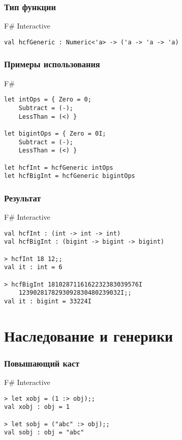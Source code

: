 \documentclass[xetex,mathserif,serif]{beamer}
\begin{document}
	\begin{frame}[fragile]
		\frametitle{Тип функции}
\begin{alertblock}{F\# Interactive}
\begin{lstlisting}[keywordstyle=\color{black}]
val hcfGeneric : Numeric<'a> -> ('a -> 'a -> 'a)
\end{lstlisting}
\end{alertblock}
\end{frame}

	\begin{frame}[fragile]
		\frametitle{Примеры использования}
		\begin{exampleblock}{F\#}
			\begin{lstlisting}
let intOps = { Zero = 0; 
    Subtract = (-); 
    LessThan = (<) }
    
let bigintOps = { Zero = 0I; 
    Subtract = (-); 
    LessThan = (<) }

let hcfInt = hcfGeneric intOps
let hcfBigInt = hcfGeneric bigintOps
\end{lstlisting}
\end{exampleblock}
\end{frame}

	\begin{frame}[fragile]
		\frametitle{Результат}
\begin{alertblock}{F\# Interactive}
\begin{lstlisting}[keywordstyle=\color{black}]
val hcfInt : (int -> int -> int)
val hcfBigInt : (bigint -> bigint -> bigint)

> hcfInt 18 12;;
val it : int = 6

> hcfBigInt 1810287116162232383039576I 
    1239028178293092830480239032I;;
val it : bigint = 33224I
\end{lstlisting}
\end{alertblock}
\end{frame}

	\section{Наследование и генерики}
	
	\begin{frame}[fragile]
		\frametitle{Повышающий каст}
\begin{alertblock}{F\# Interactive}
\begin{lstlisting}[keywordstyle=\color{black}]
> let xobj = (1 :> obj);;
val xobj : obj = 1

> let sobj = ("abc" :> obj);;
val sobj : obj = "abc"
\end{lstlisting}
\end{alertblock}
\end{frame}
\end{document}
